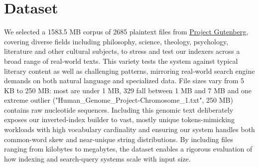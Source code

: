 \section{Dataset}

\hypersetup{
	colorlinks=true,
	urlcolor=blue
}

We selected a 1583.5 MB corpus of 2685 plaintext files from \href{https://www.gutenberg.org/}{Project Gutenberg}, covering diverse fields including philosophy, science, theology, psychology, literature and other cultural subjects, to stress and test our indexers across a broad range of real-world texts. This variety tests the system against typical literary content as well as challenging patterns, mirroring real-world search engine demands on both natural language and specialized data. File sizes vary from 5 KB to 250 MB: most are under 1 MB, 329 fall between 1 MB and 7 MB and one extreme outlier ("Human\_Genome\_Project-Chromosome\_1.txt", 250 MB) contains raw nucleotide sequences. Including this genomic text deliberately exposes our inverted-index builder to vast, mostly unique tokens-mimicking workloads with high vocabulary cardinality and ensuring our system handles both common-word skew and near-unique string distributions. By including files ranging from kilobytes to megabytes, the dataset enables a rigorous evaluation of how indexing and search-query systems scale with input size. 


